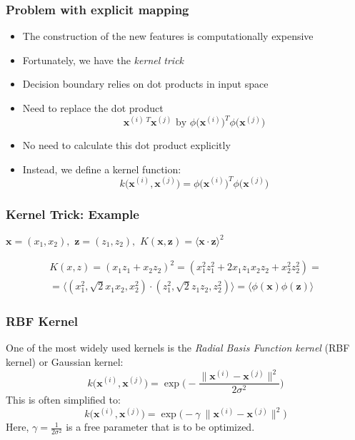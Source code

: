 \documentclass{beamer}
\begin{document}
\begin{frame}
  \frametitle{Problem with explicit mapping}
  \begin{itemize}
  \item The construction of the new features is computationally expensive
  \item Fortunately, we have the \textit{kernel trick}
  \item Decision boundary relies on dot products in input space
  \item Need to replace the dot product
    \[
    \mathbf{x}^{(i) \; T} \mathbf{x}^{(j)} \text{ by } \phi \big( \mathbf{x}^{(i)} \big)^T \phi \big( \mathbf{x}^{(j)} \big)
    \]
  \item No need to calculate this dot product explicitly
  \item Instead, we define a kernel function:
    \[
    k \big( \mathbf{x}^{(i)}, \mathbf{x}^{(j)}  \big) = \phi \big( \mathbf{x}^{(i)} \big)^T \phi \big( \mathbf{x}^{(j)} \big)
    \]
  \end{itemize}
\end{frame}

\begin{frame}
  \frametitle{Kernel Trick: Example}
  $\mathbf{x} = (x_1, x_2), $
  $\mathbf{z} = (z_1, z_2), $
  $K(\mathbf{x}, \mathbf{z}) = \langle \mathbf{x} \cdot \mathbf{z} \rangle^2$

  \begin{multline*}
  K(x, z) = (x_1z_1 + x_2z_2)^2 = (x_1^2z_1^2 + 2x_1z_1x_2z_2 + x_2^2z_2^2) = \\
  = \langle (x_1^2, \sqrt{2}x_1x_2, x_2^2) \cdot (z_1^2, \sqrt{2}z_1z_2, z_2^2) \rangle
  = \langle \phi(\mathbf{x}) \phi(\mathbf{z}) \rangle
  \end{multline*}

\end{frame}

\begin{frame}
  \frametitle{RBF Kernel}
  One of the most widely used kernels is the \textit{Radial Basis Function kernel} (RBF kernel) or Gaussian kernel:
  \[
  k \big( \mathbf{x}^{(i)}, \mathbf{x}^{(j)}  \big) = \exp \Bigg( - \frac{ \lVert \mathbf{x}^{(i)} - \mathbf{x}^{(j)} \rVert^2  }{2 \sigma^2} \Bigg)
  \]
  This is often simplified to:
  \[
  k \big( \mathbf{x}^{(i)}, \mathbf{x}^{(j)}  \big) = \exp \bigg(  -\gamma\ \lVert \mathbf{x}^{(i)} - \mathbf{x}^{(j)} \rVert^2  \bigg)
  \]
  Here, $\gamma = \frac{1}{2 \sigma^2}$ is a free parameter that is to be optimized.
\end{frame}
\end{document}

